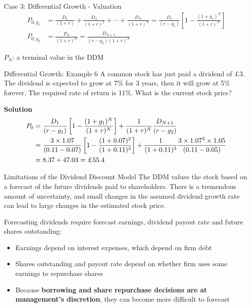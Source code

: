 \documentclass[9pt,aspectratio=169]{beamer}
\begin{document}
\begin{frame}{Case 3: Differential Growth - Valuation}
\begin{align}\nonumber
P_{0,g_1} &= \frac{D_1}{(1+r)} + \frac{D_2}{(1+r)^2} + \cdots + \frac{D_N}{(1+r)^N} = \frac{D_1}{(r-g_1)}\left[1 - \frac{(1+g_1)^N}{(1+r)^N}\right] \\\nonumber
P_{0,g_2} &= \frac{P_N}{(1+r)^N} = \frac{D_{N+1}}{(r-g_2)(1+r)^N}
\end{align}

\vspace{1cm}
\begin{center}
\end{center}

\vspace{0.6em}
$P_N$: a terminal value in the DDM
\end{frame}

\begin{frame}{Differential Growth: Example 6}
A common stock has just paid a dividend of £3. The dividend is expected to grow at 7\% for 3 years, then it will grow at 5\% forever. The required rate of return is 11\%. What is the current stock price?

\vspace{0.5cm}
\textbf{Solution}
\begin{align}\nonumber
P_0 &= \frac{D_1}{(r - g_1)}\left[1 - \frac{(1 + g_1)^N}{(1 + r)^N}\right] + \frac{1}{(1 + r)^N}\frac{D_{N+1}}{(r - g_2)} \\\nonumber
&= \frac{3 \times 1.07}{(0.11 - 0.07)}\left[1 - \frac{(1 + 0.07)^3}{(1 + 0.11)^3}\right] + \frac{1}{(1 + 0.11)^3}\frac{3 \times 1.07^3 \times 1.05}{(0.11 - 0.05)} \\\nonumber
&= \LDiffGrowthStage + \LDiffTerminal = \text{\pounds}\LDiffTotal
\end{align}

\end{frame}


\begin{frame}{Limitations of the Dividend Discount Model}
The DDM values the stock based on a forecast of the future dividends paid to shareholders.
There is a tremendous amount of uncertainty, and small changes in the assumed dividend
growth rate can lead to large changes in the estimated stock price.

\vspace{0.7em}
Forecasting dividends require forecast earnings, dividend payout rate and future shares
outstanding:
\begin{itemize}
\item Earnings depend on interest expenses, which depend on firm debt
\item Shares outstanding and payout rate depend on whether firm uses some earnings to
      repurchase shares
\item Because \textbf{borrowing and share repurchase decisions are at management's
      discretion}, they can become more difficult to forecast
\end{itemize}
\end{frame}
\end{document}
